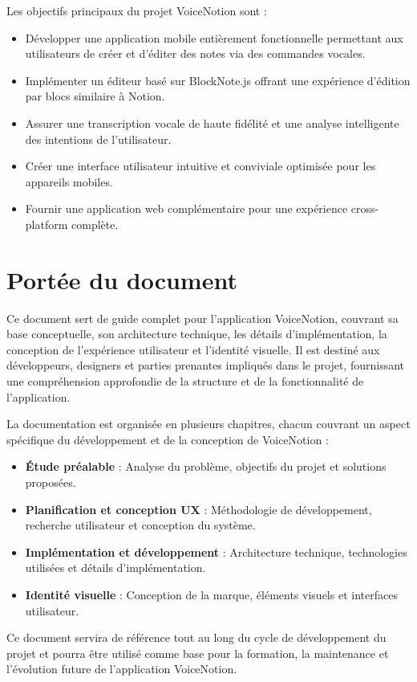 Les objectifs principaux du projet VoiceNotion sont :

\begin{itemize}
    \item Développer une application mobile entièrement fonctionnelle permettant aux utilisateurs de créer et d'éditer des notes via des commandes vocales.
    \item Implémenter un éditeur basé sur BlockNote.js offrant une expérience d'édition par blocs similaire à Notion.
    \item Assurer une transcription vocale de haute fidélité et une analyse intelligente des intentions de l'utilisateur.
    \item Créer une interface utilisateur intuitive et conviviale optimisée pour les appareils mobiles.
    \item Fournir une application web complémentaire pour une expérience cross-platform complète.
\end{itemize}

\vspace{1cm}

\section*{Portée du document}

Ce document sert de guide complet pour l'application VoiceNotion, couvrant sa base conceptuelle, son architecture technique, les détails d'implémentation, la conception de l'expérience utilisateur et l'identité visuelle. Il est destiné aux développeurs, designers et parties prenantes impliqués dans le projet, fournissant une compréhension approfondie de la structure et de la fonctionnalité de l'application.

La documentation est organisée en plusieurs chapitres, chacun couvrant un aspect spécifique du développement et de la conception de VoiceNotion :

\begin{itemize}
    \item \textbf{Étude préalable} : Analyse du problème, objectifs du projet et solutions proposées.
    \item \textbf{Planification et conception UX} : Méthodologie de développement, recherche utilisateur et conception du système.
    \item \textbf{Implémentation et développement} : Architecture technique, technologies utilisées et détails d'implémentation.
    \item \textbf{Identité visuelle} : Conception de la marque, éléments visuels et interfaces utilisateur.
\end{itemize}

Ce document servira de référence tout au long du cycle de développement du projet et pourra être utilisé comme base pour la formation, la maintenance et l'évolution future de l'application VoiceNotion. 